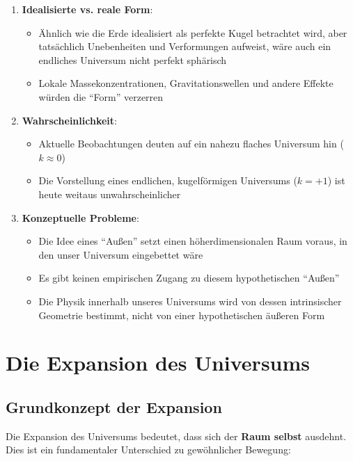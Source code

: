 \documentclass[a4paper,12pt]{article}
\begin{document}
	\begin{enumerate}
		\item \textbf{Idealisierte vs. reale Form}: 
		\begin{itemize}
			\item Ähnlich wie die Erde idealisiert als perfekte Kugel betrachtet wird, aber tatsächlich Unebenheiten und Verformungen aufweist, wäre auch ein endliches Universum nicht perfekt sphärisch
			\item Lokale Massekonzentrationen, Gravitationswellen und andere Effekte würden die ``Form'' verzerren
		\end{itemize}
		
		\item \textbf{Wahrscheinlichkeit}:
		\begin{itemize}
			\item Aktuelle Beobachtungen deuten auf ein nahezu flaches Universum hin ($k \approx 0$)
			\item Die Vorstellung eines endlichen, kugelförmigen Universums ($k = +1$) ist heute weitaus unwahrscheinlicher
		\end{itemize}
		
		\item \textbf{Konzeptuelle Probleme}:
		\begin{itemize}
			\item Die Idee eines ``Außen'' setzt einen höherdimensionalen Raum voraus, in den unser Universum eingebettet wäre
			\item Es gibt keinen empirischen Zugang zu diesem hypothetischen ``Außen''
			\item Die Physik innerhalb unseres Universums wird von dessen intrinsischer Geometrie bestimmt, nicht von einer hypothetischen äußeren Form
		\end{itemize}
	\end{enumerate}
	
	\section{Die Expansion des Universums}
	
	\subsection{Grundkonzept der Expansion}
	
	Die Expansion des Universums bedeutet, dass sich der \textbf{Raum selbst} ausdehnt. Dies ist ein fundamentaler Unterschied zu gewöhnlicher Bewegung:
	
\end{document}
